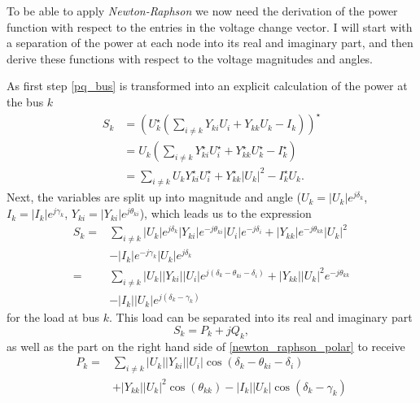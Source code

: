 To be able to apply \emph{Newton-Raphson} we now need the derivation of the power function with respect to the entries in the voltage change vector. I will start with a separation of the power at each node into its real and imaginary part, and then derive these functions with respect to the voltage magnitudes and angles.

As first step \eqref{pq_bus} is transformed into an explicit calculation of the power at the bus $k$
\begin{align}
	S_k &= \left( U_k^\star \left( \sum_{i \ne k} Y_{ki} U_i + Y_{kk} U_k - I_k \right) \right)^\star \\
		&= U_k \left( \sum_{i \ne k} Y_{ki}^\star U_i^\star + Y_{kk}^\star U_k^\star - I_k^\star \right) \\
		&= \sum_{i \ne k} U_k Y_{ki}^\star U_i^\star + Y_{kk}^\star |U_k|^2 - I_k^\star U_k.
	\label{eq:complex_power}
\end{align}
Next, the variables are split up into magnitude and angle ($U_k = |U_k| e^{j \delta_k}$, $I_k = |I_k| e^{j \gamma_k}$, $Y_{ki} = |Y_{ki}| e^{j \theta_{ki}}$), which leads us to the expression
\begin{equation}
	\begin{split}
		S_k = 	& \sum_{i \ne k} |U_k| e^{j \delta_k} |Y_{ki}| e^{-j \theta_{ki}} |U_i| e^{-j \delta_i} + |Y_{kk}| e^{-j \theta_{kk}} |U_k|^2 \\
				& - |I_k| e^{-j \gamma_k} |U_k| e^{j \delta_k} \\
			= 	& \sum_{i \ne k} |U_k| |Y_{ki}| |U_i| e^{j \left( \delta_k - \theta_{ki} - \delta_i \right)} + |Y_{kk}| |U_k|^2 e^{-j \theta_{kk}} \\
				& - |I_k| |U_k| e^{j \left( \delta_k - \gamma_k \right)}
	\end{split}
	\label{eq:newton_raphson_polar}
\end{equation}
for the load at bus $k$. This load can be separated into its real and imaginary part
\begin{equation}
	S_k = P_k + j Q_k,
\end{equation}
as well as the part on the right hand side of \eqref{newton_raphson_polar} to receive
\begin{equation}
	\begin{split}
		P_k = 	& \sum_{i \ne k} |U_k| |Y_{ki}| |U_i| \cos \left( \delta_k - \theta_{ki} - \delta_i \right) \\
				& + |Y_{kk}| |U_k|^2 \cos \left( \theta_{kk} \right) - |I_k| |U_k| \cos \left( \delta_k - \gamma_k \right)
	\end{split}
\end{equation}
